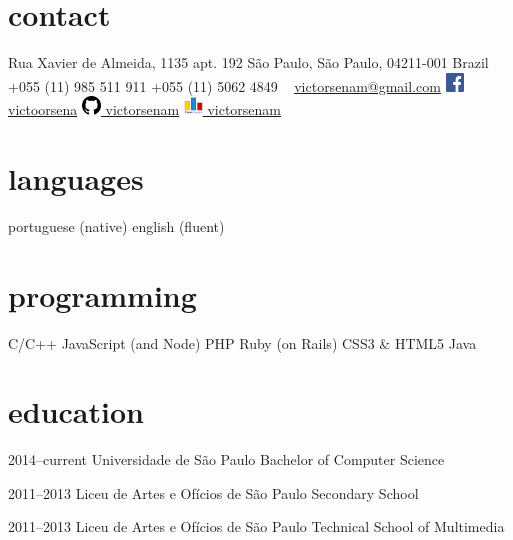 \documentclass[]{friggeri-cv} %
\begin{document}


\begin{aside} %
\section{contact}
Rua Xavier de Almeida, 1135 apt. 192
São Paulo, São Paulo, 04211-001
Brazil
~
+055 (11) 985 511 911
+055 (11) 5062 4849
~
\href{mailto:victorsenam@gmail.com}{victorsenam@gmail.com}
\href{http://facebook.com/victoorsena}{\includegraphics[width=0.5cm]{img/fb.png} \hfill victoorsena}
\href{http://github.com/victorsenam}{\includegraphics[width=0.5cm]{img/github.png} \hfill victorsenam}
\href{http://codeforces.com/profiles/victorsenam}{\includegraphics[width=0.5cm]{img/codeforces.png} \hfill victorsenam}
\section{languages}
portuguese (native)
english (fluent)
\section{programming}
C/C++
JavaScript (and Node)
PHP
Ruby (on Rails)
CSS3 \& HTML5
Java
\end{aside}


\section{education}

\begin{entrylist}


\entry
{2014--current}
{Universidade de São Paulo}
{Bachelor of Computer Science}

\entry
{2011--2013}
{Liceu de Artes e Ofícios de São Paulo}
{Secondary School}

\entry
{2011--2013}
{Liceu de Artes e Ofícios de São Paulo}
{Technical School of Multimedia}


\end{entrylist}
\end{document}
